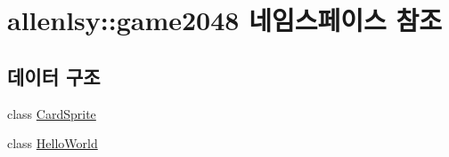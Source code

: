 \hypertarget{namespaceallenlsy_1_1game2048}{}\section{allenlsy\+:\+:game2048 네임스페이스 참조}
\label{namespaceallenlsy_1_1game2048}
\subsection*{데이터 구조}
\begin{DoxyCompactItemize}
\item 
class \hyperlink{classallenlsy_1_1game2048_1_1_card_sprite}{Card\+Sprite}
\item 
class \hyperlink{classallenlsy_1_1game2048_1_1_hello_world}{Hello\+World}
\end{DoxyCompactItemize}
